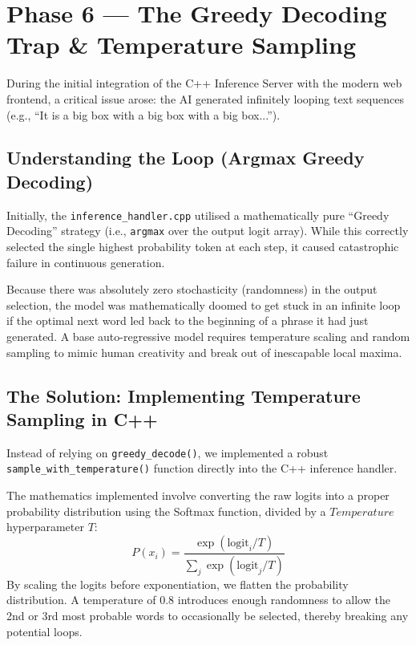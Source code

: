 \documentclass[12pt, a4paper]{article}
\begin{document}
\newpage
\section{Phase 6 --- The Greedy Decoding Trap \& Temperature Sampling}

\begin{tcolorbox}[designbox, title={Phase 6 Problem Statement}]
  During the initial integration of the C++ Inference Server with the modern web frontend, a critical issue arose: the AI generated infinitely looping text sequences (e.g., ``It is a big box with a big box with a big box...'').
\end{tcolorbox}

\subsection{Understanding the Loop (Argmax Greedy Decoding)}
Initially, the \texttt{inference\_handler.cpp} utilised a mathematically pure ``Greedy Decoding'' strategy (i.e., \texttt{argmax} over the output logit array). While this correctly selected the single highest probability token at each step, it caused catastrophic failure in continuous generation. 

Because there was absolutely zero stochasticity (randomness) in the output selection, the model was mathematically doomed to get stuck in an infinite loop if the optimal next word led back to the beginning of a phrase it had just generated. A base auto-regressive model requires temperature scaling and random sampling to mimic human creativity and break out of inescapable local maxima.

\subsection{The Solution: Implementing Temperature Sampling in C++}
Instead of relying on \texttt{greedy\_decode()}, we implemented a robust \texttt{sample\_with\_temperature()} function directly into the C++ inference handler. 

The mathematics implemented involve converting the raw logits into a proper probability distribution using the Softmax function, divided by a $Temperature$ hyperparameter $T$:
\[
P(x_i) = \frac{\exp(\text{logit}_i / T)}{\sum_{j} \exp(\text{logit}_j / T)}
\]
By scaling the logits before exponentiation, we flatten the probability distribution. A temperature of $0.8$ introduces enough randomness to allow the 2nd or 3rd most probable words to occasionally be selected, thereby breaking any potential loops. 
\end{document}
